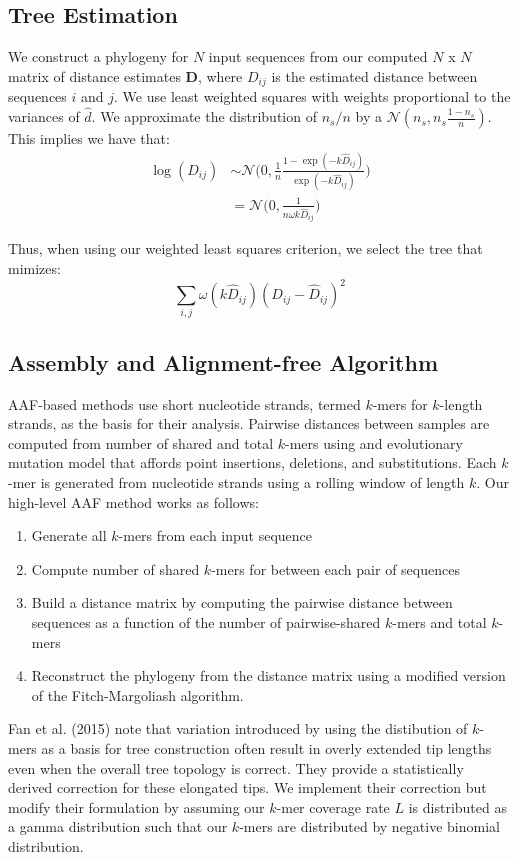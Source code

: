 \documentclass[a4paper]{article}
\begin{document}
\begin{multicols}{2}
\subsection{Tree Estimation}
We construct a phylogeny for $N$ input sequences from our computed $N$ x $N$ matrix of distance estimates $\mathbf{D}$, where $D_{ij}$ is the estimated distance between sequences $i$ and $j$. We use least weighted squares with weights proportional to the variances of $\hat{d}$. We approximate the distribution of $n_s/n$ by a $\mathcal{N}(n_s, n_s\frac{1-n_s}{n})$. This implies we have that:
\begin{align*}
\log(D_{ij}) &\sim \mathcal{N}\Big(0, \frac{1}{n}\frac{1 - \exp(-k \hat{D}_{ij})}{\exp(-k \hat{D}_{ij})}\Big) \\
&= \mathcal{N}\Big(0, \frac{1}{n \omega k \hat{D}_{ij}}\Big)
\end{align*}

Thus, when using our weighted least squares criterion, we select the tree that mimizes:
$$
\sum_{i,j} \omega (k\hat{D}_{ij})(D_{ij} - \hat{D}_{ij})^2
$$
\subsection{Assembly and Alignment-free Algorithm}
AAF-based methods use short nucleotide strands, termed $k$-mers for $k$-length strands, as the basis for their analysis. Pairwise distances between samples are computed from number of shared and total $k$-mers using and evolutionary mutation model that affords point insertions, deletions, and substitutions. Each $k$-mer is generated from nucleotide strands using a rolling window of length $k$. Our high-level AAF method works as follows:
\begin{enumerate}
    \item Generate all $k$-mers from each input sequence
    \item Compute number of shared $k$-mers for between each pair of sequences
    \item Build a distance matrix by computing the pairwise distance between sequences as a function of the number of pairwise-shared $k$-mers and total $k$-mers
    \item Reconstruct the phylogeny from the distance matrix using a modified version of the Fitch-Margoliash algorithm.
\end{enumerate}

Fan et al. (2015) note that variation introduced by using the distibution of $k$-mers as a basis for tree construction often result in overly extended tip lengths even when the overall tree topology is correct. They provide a statistically derived correction for these elongated tips. We implement their correction but modify their formulation by assuming our $k$-mer coverage rate $L$ is distributed as a gamma distribution such that our $k$-mers are distributed by negative binomial distribution.


\end{multicols}
\end{document}

